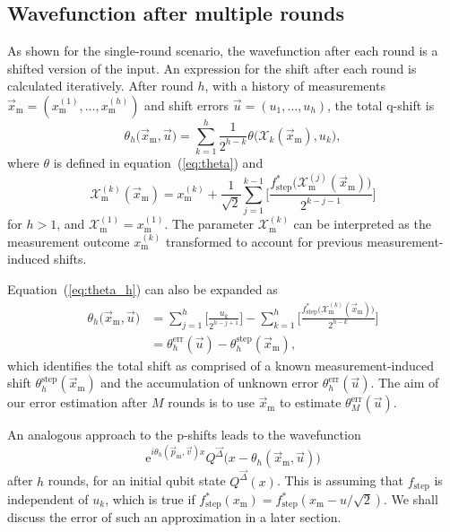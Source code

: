 \documentclass[prx,reprint,superscriptaddress,longbibliography,floatfix,nofootinbib]{revtex4-1}
\begin{document}
\subsection*{Wavefunction after multiple rounds}
As shown for the single-round scenario, the wavefunction after each round is a shifted version of the input. An expression for the shift after each round is calculated iteratively. After round $h$, with a history of measurements $\vec{x}_\mathrm{m}=(x_\mathrm{m}^{(1)},\dotsc ,x_\mathrm{m}^{(h)})$ and shift errors $\vec{u}=(u_1,\dotsc ,u_h)$, the total q-shift is 
\begin{equation}\label{eq:theta_h}
    \theta_h\big(\vec{x}_\mathrm{m},\vec{u}\big)=\sum_{k=1}^{h} \frac{1}{2^{h-k}}\theta\big(\mathcal{X}_k(\vec{x}_\mathrm{m}),u_k\big),
\end{equation}
where $\theta$ is defined in equation~(\ref{eq:theta}) and
\begin{equation}
\mathcal{X}^{(k)}_{\text{m}}(\vec{x}_\mathrm{m}) = x^{(k)}_{\text{m}} + \frac{1}{\sqrt{2}}\sum_{j=1}^{k-1}\Big[\frac{f_\text{step}^{*}\big(\mathcal{X}_\text{m}^{(j)}(\vec{x}_\mathrm{m})\big)}{2^{k-j-1}}\Big]
\end{equation}
for $h>1$, and $\mathcal{X}^{(1)}_{\text{m}} = x^{(1)}_{\text{m}}$. The parameter $\mathcal{X}^{(k)}_{\text{m}}$ can be interpreted as the measurement outcome $x^{(k)}_{\text{m}}$ transformed to account for previous measurement-induced shifts.

Equation~(\ref{eq:theta_h}) can also be expanded as
\begin{equation}
\begin{split}
\theta_h\big(\vec{x}_\mathrm{m},\vec{u}\big) &= \sum_{j=1}^{h}\Big[\frac{u_k}{2^{h-j+1}}\Big] -
\sum_{k=1}^{h}\Big[\frac{f_\text{step}^{*}\big(\mathcal{X}_\text{m}^{(k)}(\vec{x}_\mathrm{m})\big)}{2^{h-k}}\Big] \\
&= \theta_h^{\mathrm{err}}(\vec{u})-\theta_h^{\mathrm{step}}(\vec{x}_\mathrm{m}),
\end{split}
\end{equation}
which identifies the total shift as comprised of a known measurement-induced shift $\theta_h^{\mathrm{step}}(\vec{x}_\mathrm{m})$ and the accumulation of unknown error $\theta_h^{\mathrm{err}}(\vec{u})$.
The aim of our error estimation after $M$ rounds is to use $\vec{x}_\mathrm{m}$ to estimate $\theta_M^{\mathrm{err}}(\vec{u})$. 

An analogous approach to the p-shifts leads to the wavefunction
\begin{equation}
\text{e}^{i\theta_h(\vec{p}_\mathrm{m},\vec{v})x}Q^{\vec{\Delta}}\big(x-\theta_h(\vec{x}_\mathrm{m},\vec{u})\big)
\label{eq:main}
\end{equation}
after $h$ rounds, for an initial qubit state $Q^{\vec{\Delta}}(x)$. This is assuming that $f_{\text{step}}$ is independent of $u_{k}$, which is true if $f_\text{step}^{*}(x_\text{m}) = f_\text{step}^{*}(x_\text{m}-u/\sqrt{2})$. We shall discuss the error of such an approximation in a later section.
\end{document}
